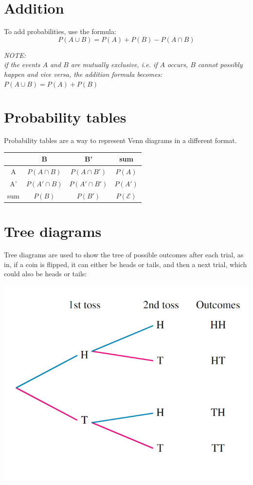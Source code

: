 \documentclass{book}
\newenvironment{note}{\begin{center}\em NOTE:\\}{\end{center}}
\begin{document}
\section{Addition}
To add probabilities, use the formula:
\[
	P(A \cup B) = P(A) + P(B) - P(A \cap B)
\]
\begin{note}
	if the events $A$ and $B$ are mutually exclusive, i.e. if $A$ occurs, $B$ cannot possibly happen and vice versa, the addition formula becomes: $P(A \cup B) = P(A) + P(B)$
\end{note}

\section{Probability tables}
Probability tables are a way to represent Venn diagrams in a different format.
\begin{center}
	\begin{tabular}{c|c|c|c}
		    & B              & B'              & sum              \\ \hline
		A   & $P(A \cap B)$  & $P(A \cap B')$  & $P(A)$           \\ \hline
		A'  & $P(A' \cap B)$ & $P(A' \cap B')$ & $P(A')$          \\ \hline
		sum & $P(B)$         & $P(B')$         & $P(\mathcal{E})$
	\end{tabular}
\end{center}

\section{Tree diagrams}
Tree diagrams are used to show the tree of possible outcomes after each trial, as in, if a coin is flipped, it can either be heads or tails, and then a next trial, which could also be heads or tails:
\begin{center}
	\includegraphics[scale=0.5]{tree diagrams}
\end{center}
\end{document}
